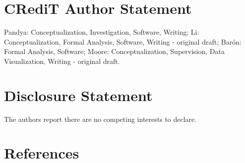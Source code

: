 \documentclass[12pt]{article}
\begin{document}
\hypertarget{credit-author-statement}{%
\section{CRediT Author Statement}\label{credit-author-statement}}

Pandya: Conceptualization, Investigation, Software, Writing; Li: Conceptualization, Formal Analysis, Software, Writing - original draft; Barón: Formal Analysis, Software; Moore: Conceptualization, Supervision, Data Visualization, Writing - original draft.

\hypertarget{disclosure-statement}{%
\section{Disclosure Statement}\label{disclosure-statement}}

The authors report there are no competing interests to declare.

\hypertarget{references}{%
\section{References}\label{references}}
\end{document}
